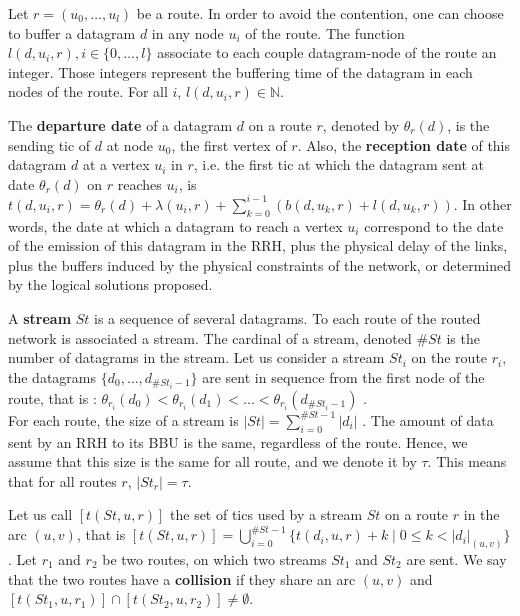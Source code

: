 \documentclass[10pt]{article}
\begin{document}
          Let $r=(u_0,\dots,u_l)$ be a route. In order to avoid the contention, one can choose to buffer a datagram $d$ in any node $u_i$ of the route. The function $l(d,u_i,r), i \in \{0,\ldots,l\}$ associate to each couple datagram-node of the route an integer. Those integers represent the buffering time of the datagram in each nodes of the route. For all $i$, $l(d,u_i,r) \in \mathbb{N}$.
              
The \textbf{departure date} of a datagram $d$ on a route $r$, denoted by $\theta_r(d)$, is the sending tic of $d$ at node $u_0$, the first vertex of $r$. 
 Also, the \textbf{reception date} of this datagram $d$ at a vertex $u_i$ in $r$, i.e. the first tic at which the datagram sent at date $\theta_r(d)$ on $r$ reaches $u_i$, is $t(d,u_i,r) = \theta_r(d) + \lambda(u_i,r) + \sum_{k=0}^{i-1}( b(d,u_k,r) + l(d,u_k,r))$. In other words, the date at which a datagram to reach a vertex $u_i$ correspond to the date of the emission of this datagram in the RRH, plus the physical delay of the links, plus the buffers induced by the physical constraints of the network, or determined by the logical solutions proposed.
   
        A {\bf stream} $St$ is a sequence of several datagrams. To each route of the routed network is associated a stream. The cardinal of a stream, denoted $\#St$ is the number of datagrams in the stream. Let us consider a stream $St_i$ on the route $r_i$, the datagrams $\{d_0,\ldots,d_{\#St_i-1}\}$ are sent in sequence from the first node of the route, that is : $\theta_{r_i}(d_0) < \theta_{r_i}(d_1) < \ldots < \theta_{r_i}(d_{\#St_i-1})$ .  \\
       For each route, the size of a stream is $|St| = \sum_{i=0}^{{\#St-1}} |d_i|$ . The amount of data sent by an RRH to its BBU is the same, regardless of the route. Hence, we assume that this size is the same for all route, and we denote it by $\tau$. This means that for all routes $r$, $|St_r| = \tau$.
        
          
       Let us call $[t(St,u,r)]$ the set of tics used by a stream $St$ on a route $r$ in the arc $(u,v)$, that is $[t(St,u,r)] =  \bigcup_{i=0}^{\#St -1} \{t(d_i,u,r) + k \mid 0 \leq k < |d_i|_{(u,v)}\}$.
      Let $r_1$ and $r_2$ be two routes, on which two streams $St_1$ and $St_2$ are sent.
      We say that the two routes have a {\bf collision} if they share an arc $(u,v)$ and $[t(St_1,u,r_{1})] \cap [t(St_2,u,r_{2})] \neq \emptyset$.
            
\end{document}
